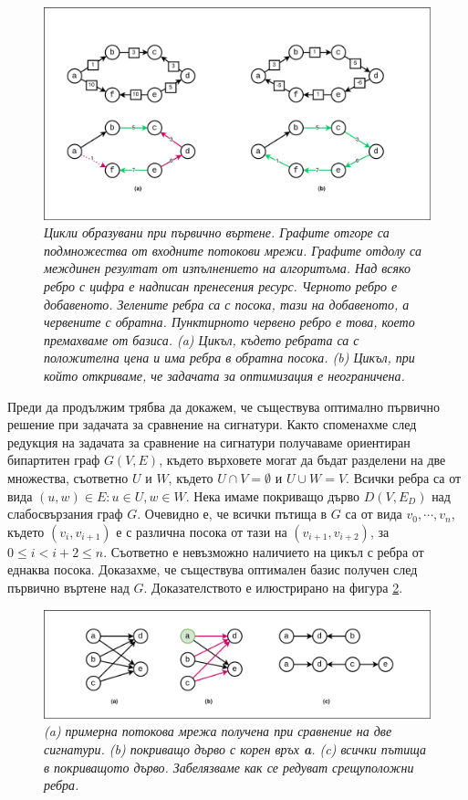 \documentclass[a4paper,12pt]{article}
\begin{document}
\begin{figure}[ht]
    \centering
    \includegraphics[width=\textwidth]{primalpivotcycle.png}
    \caption{\textit{Цикли образувани при първично въртене. Графите отгоре са подмножества от входните потокови мрежи. Графите отдолу са междинен резултат от изпълнението на алгоритъма. Над всяко ребро с цифра е надписан пренесения ресурс. Черното ребро е добавеното. Зелените ребра са с посока, тази на добавеното, а червените с обратна. Пунктирното червено ребро е това, което премахваме от базиса. (a) Цикъл, където ребрата са с положителна цена и има ребра в обратна посока. (b) Цикъл, при който откриваме, че задачата за оптимизация е неограничена.}}
    \label{fig:primalpivotcycle}
\end{figure}

\bigbreak

Преди да продължим трябва да докажем, че съществува оптимално първично решение при задачата за сравнение на сигнатури. Както споменахме след редукция на задачата за сравнение на сигнатури получаваме ориентиран бипартитен граф $G(V, E)$, където върховете могат да бъдат разделени на две множества, съответно $U$ и $W$, където $U \cap V = \emptyset$ и $U \cup W = V$. Всички ребра са от вида $(u, w) \in E: u \in U, w \in W$. Нека имаме покриващо дърво $D(V, E_D)$ над слабосвързания граф $G$. Очевидно е, че всички пътища в $G$ са от вида $v_0, \cdots, v_n$, където $(v_i, v_{i+1})$ е с различна посока от тази на $(v_{i+1}, v_{i+2})$, за $0 \leq i < i+2 \leq n$. Съответно е невъзможно наличието на цикъл с ребра от еднаква посока. Доказахме, че съществува оптимален базис получен след първично въртене над $G$. Доказателството е илюстрирано на фигура \ref{fig:primalboundednessproof}.

\begin{figure}[ht]
    \centering
    \includegraphics[width=\textwidth]{primalboundednessproof.png}
    \caption{\textit{(a) примерна потокова мрежа получена при сравнение на две сигнатури. (b) покриващо дърво с корен връх \textbf{a}. (c) всички пътища в покриващото дърво. Забелязваме как се редуват срещуположни ребра.}}
    \label{fig:primalboundednessproof}
\end{figure}
\end{document}
